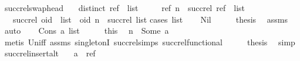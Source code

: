 \begin{isabellebody}
\isamarkupfalse%
%
\endisatagproof
{\isafoldproof}%
%
\isadelimproof
\isanewline
%
\endisadelimproof
\isanewline
{}\isamarkupfalse%
\ succ{\isacharunderscore}rel{\isacharunderscore}swap{\isacharunderscore}head{\isacharcolon}\isanewline
\ \ \ {\isachardoublequoteopen}distinct\ {\isacharparenleft}ref\ {\isacharhash}\ list{\isacharparenright}{\isachardoublequoteclose}\isanewline
\ \ \ \ \ {\isachardoublequoteopen}{\isacharparenleft}ref{\isacharcomma}\ n{\isacharparenright}\ {\isasymin}\ succ{\isacharunderscore}rel\ {\isacharparenleft}ref\ {\isacharhash}\ list{\isacharparenright}{\isachardoublequoteclose}\isanewline
\ \ \ {\isachardoublequoteopen}succ{\isacharunderscore}rel\ {\isacharparenleft}oid\ {\isacharhash}\ list{\isacharparenright}\ {\isacharequal}\ {\isacharbraceleft}{\isacharparenleft}oid{\isacharcomma}\ n{\isacharparenright}{\isacharbraceright}\ {\isasymunion}\ succ{\isacharunderscore}rel\ list{\isachardoublequoteclose}\isanewline
%
\isadelimproof
%
\endisadelimproof
%
\isatagproof
{}\isamarkupfalse%
{\isacharparenleft}cases\ list{\isacharparenright}\isanewline
\ \ \isamarkupfalse%
\ Nil\isanewline
\ \ \isamarkupfalse%
\ \isamarkupfalse%
\ {\isacharquery}thesis\ \isamarkupfalse%
\ assms\ \isamarkupfalse%
\ auto\isanewline
{}\isamarkupfalse%
\isanewline
\ \ \isamarkupfalse%
\ {\isacharparenleft}Cons\ a\ list{\isacharparenright}\isanewline
\ \ \isamarkupfalse%
\ \isamarkupfalse%
\ this\ \isamarkupfalse%
\ {\isachardoublequoteopen}n\ {\isacharequal}\ Some\ a{\isachardoublequoteclose}\isanewline
\ \ \ \ \isamarkupfalse%
\ {\isacharparenleft}metis\ Un{\isacharunderscore}iff\ assms\ singletonI\ succ{\isacharunderscore}rel{\isachardot}simps{\isacharparenleft}{}{\isacharparenright}\ succ{\isacharunderscore}rel{\isacharunderscore}functional{\isacharparenright}\isanewline
\ \ \isamarkupfalse%
\ \isamarkupfalse%
\ {\isacharquery}thesis\ \isamarkupfalse%
\ simp\isanewline
{}\isamarkupfalse%
%
\endisatagproof
{\isafoldproof}%
%
\isadelimproof
\isanewline
%
\endisadelimproof
\isanewline
{}\isamarkupfalse%
\ succ{\isacharunderscore}rel{\isacharunderscore}insert{\isacharunderscore}alt{\isacharcolon}\isanewline
\ \ \ {\isachardoublequoteopen}a\ {\isasymnoteq}\ ref{\isachardoublequoteclose}\isanewline

\end{isabellebody}
